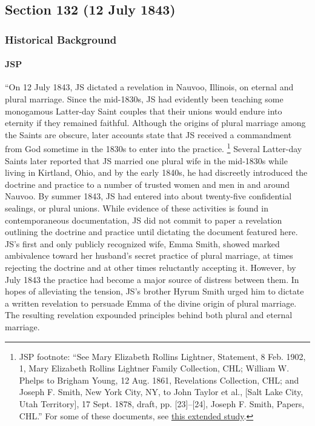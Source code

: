 \subsection{Section 132 (12 July 1843)}
	\label{DC132}
	
	\subsubsection{Historical Background}
		\label{DC132-HB}
		
		\paragraph{JSP}
		
			``On 12 July 1843, JS dictated a revelation in Nauvoo, Illinois, on eternal and plural marriage. Since the mid-1830s, JS had evidently been teaching some monogamous Latter-day Saint couples that their unions would endure into eternity if they remained faithful. Although the origins of plural marriage among the Saints are obscure, later accounts state that JS received a commandment from God sometime in the 1830s to enter into the practice.%
				\footnote{%
					JSP footnote: ``See Mary Elizabeth Rollins Lightner, Statement, 8 Feb. 1902, 1, Mary Elizabeth Rollins Lightner Family Collection, CHL; William W. Phelps to Brigham Young, 12 Aug. 1861, Revelations Collection, CHL; and Joseph F. Smith, New York City, NY, to John Taylor et al., [Salt Lake City, Utah Territory], 17 Sept. 1878, draft, pp. [23]--[24], Joseph F. Smith, Papers, CHL.'' For some of these documents, see \hyperref[EXSS-DC132]{this extended study}.
					}
			Several Latter-day Saints later reported that JS married one plural wife in the mid-1830s while living in Kirtland, Ohio, and by the early 1840s, he had discreetly introduced the doctrine and practice to a number of trusted women and men in and around Nauvoo. By summer 1843, JS had entered into about twenty-five confidential sealings, or plural unions. While evidence of these activities is found in contemporaneous documentation, JS did not commit to paper a revelation outlining the doctrine and practice until dictating the document featured here. JS's first and only publicly recognized wife, Emma Smith, showed marked ambivalence toward her husband's secret practice of plural marriage, at times rejecting the doctrine and at other times reluctantly accepting it. However, by July 1843 the practice had become a major source of distress between them. In hopes of alleviating the tension, JS's brother Hyrum Smith urged him to dictate a written revelation to persuade Emma of the divine origin of plural marriage. The resulting revelation expounded principles behind both plural and eternal marriage.

